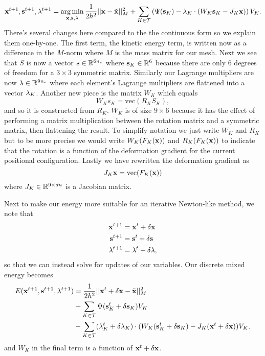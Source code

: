 \begin{equation}
\mathbf{x}^{t+1}, \mathbf{s}^{t+1}, \mathbf{\lambda}^{t+1} = \operatorname*{arg\,min}_{\mathbf{x},\mathbf{s},\mathbf{\lambda}} \frac{1}{2h^2}||\mathbf{x} - \tilde{\mathbf{x}}||_M^2 
+ \sum_{K \in \mathcal{T}} \left( \Psi(\mathbf{s}_K) - \mathbf{\lambda}_K \cdot (W_K \mathbf{s}_K - J_K \mathbf{x}) \right) V_K.
\end{equation}
There's several changes here compared to the the continuous form so we explain them one-by-one. The first term, the kinetic energy term, is written now as a difference in the $M$-norm where $M$ is the mass matrix for our mesh. Next we see that $S$ is now a vector $\mathbf{s} \in \mathbb{R}^{6n_e}$ where $\mathbf{s}_K \in \mathbb{R}^6$ because there are only 6 degrees of freedom for a $3 \times 3$ symmetric matrix. Similarly our Lagrange multipliers are now $\mathbf{\lambda} \in \mathbb{R}^{9n_e}$ where each element's Lagrange multipliers are flattened into a vector $\mathbf{\lambda}_K$. Another new piece is the matrix $W_K$ which equals
\begin{equation}
W_K s_K = \text{vec}(R_K S_K),
\end{equation}
and so it is constructed from $R_K$. $W_K$ is of size $9 \times 6$ because it has the effect of performing a matrix multiplication between the rotation matrix and a symmetric matrix, then flattening the result. To simplify notation we just write $W_K$ and $R_K$ but to be more precise we would write $W_K(F_K(\mathbf{x}))$ and $R_K(F_K(\mathbf{x}))$ to indicate that the rotation is a function of the deformation gradient for the current positional configuration. Lastly we have rewritten the deformation gradient as
\begin{equation}
J_K \mathbf{x} = \text{vec}(F_K(\mathbf{x}))
\end{equation}
where $J_K \in \mathbb{R}^{9 \times dn}$ is a Jacobian matrix. 

Next to make our energy more suitable for an iterative Newton-like method, we note that
\begin{align*}
\mathbf{x}^{t+1} &= \mathbf{x}^t + \delta \mathbf{x} \\
\mathbf{s}^{t+1} &= \mathbf{s}^t + \delta \mathbf{s} \\
\mathbf{\lambda}^{t+1} &= \mathbf{\lambda}^t + \delta \mathbf{\lambda},
\end{align*}
so that we can instead solve for updates of our variables. Our discrete mixed energy becomes
\begin{equation}
\begin{split}
E(\mathbf{x}^{t+1}, \mathbf{s}^{t+1}, \mathbf{\lambda}^{t+1}) &= \frac{1}{2h^2}||\mathbf{x}^t + \delta \mathbf{x} - \tilde{\mathbf{x}}||_M^2 \\
&+ \sum_{K \in \mathcal{T}} \Psi(\mathbf{s}_K^t + \delta \mathbf{s}_K) V_K  \\
&-  \sum_{K \in \mathcal{T}} (\mathbf{\lambda}_K^t + \delta \mathbf{\lambda}_K) \cdot (W_K (\mathbf{s}_K^t + \delta \mathbf{s}_K) - J_K(\mathbf{x}^t + \delta \mathbf{x})) V_K.
\end{split}
\end{equation}
and $W_K$ in the final term is a function of $\mathbf{x}^t + \delta \mathbf{x}$. 

